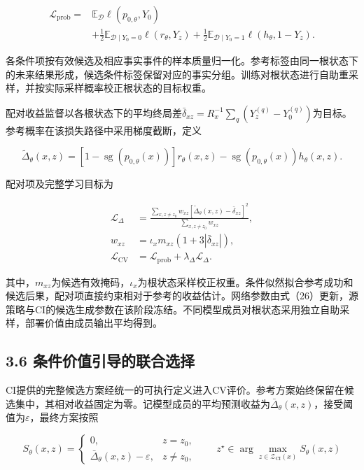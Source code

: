 \documentclass[UTF8,10.5pt,a4paper,fontset=none]{ctexart}
\begin{document}
\[
\begin{aligned}
\mathcal L_{\mathrm{prob}}={}&
\mathbb E_{\mathcal D}\ell(p_{0,\theta},Y_0)\\
&+\frac12\mathbb E_{\mathcal D\mid Y_0=0}\ell(r_\theta,Y_z)
+\frac12\mathbb E_{\mathcal D\mid Y_0=1}\ell(h_\theta,1-Y_z).
\end{aligned}
\tag{24}
\]

各条件项按有效候选及相应事实事件的样本质量归一化。参考标签由同一根状态下的未来结果形成，候选条件标签保留对应的事实分组。训练对根状态进行自助重采样，并按实际采样概率校正根状态的目标权重。

配对收益监督以各根状态下的平均终局差\(\bar\delta_{xz}=R_x^{-1}\sum_q(Y_z^{(q)}-Y_0^{(q)})\)为目标。参考概率在该损失路径中采用梯度截断，定义

\[
\widetilde\Delta_\theta(x,z)=
[1-\operatorname{sg}(p_{0,\theta}(x))]r_\theta(x,z)
-\operatorname{sg}(p_{0,\theta}(x))h_\theta(x,z).
\tag{25}
\]

配对项及完整学习目标为

\[
\begin{aligned}
\mathcal L_\Delta&=
\frac{\sum_{x,z\ne z_0}w_{xz}
[\widetilde\Delta_\theta(x,z)-\bar\delta_{xz}]^2}
{\sum_{x,z\ne z_0}w_{xz}},\\
w_{xz}&=\iota_xm_{xz}(1+3|\bar\delta_{xz}|),\\
\mathcal L_{\mathrm{CV}}&=\mathcal L_{\mathrm{prob}}+\lambda_\Delta\mathcal L_\Delta.
\end{aligned}
\tag{26}
\]

其中，\(m_{xz}\)为候选有效掩码，\(\iota_x\)为根状态采样校正权重。条件似然拟合参考成功和候选后果，配对项直接约束相对于参考的收益估计。网络参数由式（26）更新，源策略与CI的候选生成参数在该阶段冻结。不同模型成员对根状态采用独立自助采样，部署价值由成员输出平均得到。

\subsection{3.6
条件价值引导的联合选择}\label{ux6761ux4ef6ux4ef7ux503cux5f15ux5bfcux7684ux8054ux5408ux9009ux62e9}

CI提供的完整候选方案经统一的可执行定义进入CV评价。参考方案始终保留在候选集中，其相对收益固定为零。记模型成员的平均预测收益为\(\bar\Delta_\theta(x,z)\)，接受阈值为\(\varepsilon\)，最终方案按照

\[
S_\theta(x,z)=
\begin{cases}
0,&z=z_0,\\
\bar\Delta_\theta(x,z)-\varepsilon,&z\ne z_0,
\end{cases}
\qquad
z^\star\in\arg\max_{z\in\mathcal Z_{\mathrm{CI}}(x)}S_\theta(x,z)
\tag{27}
\]
\end{document}
